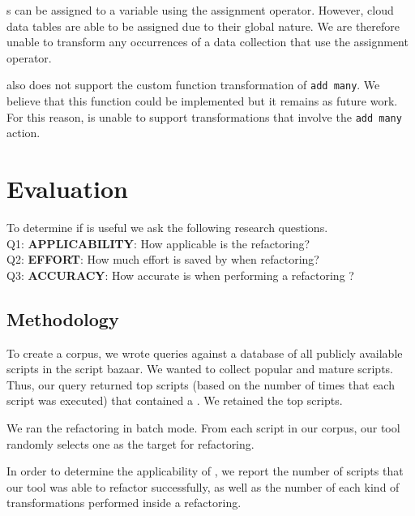 \documentclass{sigplanconf}
\begin{document}
 \NC{}s can be assigned to a variable using the assignment operator.  However, cloud data tables are able to be assigned due to their global nature.  We are therefore unable to transform any occurrences of a data collection that use the assignment operator. 

\tool also does not support the custom function transformation of \texttt{add many}.  We believe that this function could be implemented but it remains as future work.  For this reason,  \tool is unable to support transformations that involve the \texttt{add many} action.



\section{Evaluation}
\label{sec:evaluation}
To determine if \tool is useful we ask the following research questions.\\
Q1:  \textbf{APPLICABILITY}:  How applicable is the refactoring?\\
Q2:  \textbf{EFFORT}: How much effort is saved by \tool when refactoring?\\
Q3:  \textbf{ACCURACY}: How accurate is \tool when performing a refactoring ?\\
 
\subsection{Methodology}

To create a corpus, we wrote queries against a database of all publicly available scripts in the \TD script bazaar. We wanted to collect popular and mature scripts. 
Thus, our query returned top scripts (based on the number of times that each script was executed) 
that contained a \NC{}. We retained the top \numScripts scripts.


We ran the refactoring in batch mode. From each script in our corpus, our tool randomly selects one \NC{} as the target for refactoring. 

In order to determine the applicability of \tool, we report the number of scripts that our tool was able to refactor successfully, as well as the number of each kind of transformations performed inside a refactoring.
\end{document}
